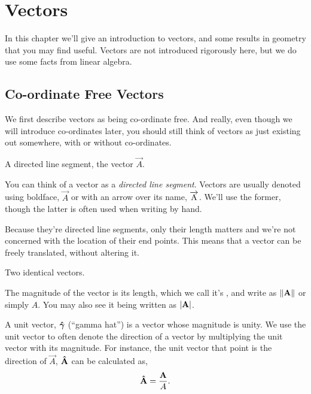 \setlength{\chnumsep}{14em}
\chapter{Vectors}

\begin{overview}
In this chapter we'll give an introduction to vectors, and some results in
geometry that you may find useful. Vectors are not introduced rigorously here,
but we do use some facts from linear algebra.
\end{overview}

\section{Co-ordinate Free Vectors}

We first describe vectors as being co-ordinate free. And really, even
though we will introduce co-ordinates later, you should still
think of vectors as just existing out somewhere, with or without
co-ordinates.

\begin{marginfigure}
\caption{A directed line segment, the vector \(\vec{A}\).}
\end{marginfigure}

You can think of a  vector as a \emph{directed line segment}.
Vectors are usually denoted using boldface, \(\vec{A}\) or with an arrow over its name,
\(\overrightarrow{\mathrm{A}}\). We'll use the former, though the latter is often used when writing by hand.


Because they're directed line segments, only their length matters and
we’re not concerned with the location of their end points. This means that a
vector can be freely translated, without altering it.

\begin{marginfigure}
\caption{Two identical vectors.}
\end{marginfigure}

The magnitude of the vector is its length, which we call it's , and write
as \(\norm{\mathbf{\boldsymbol{A}}}\) or simply \(A\). You may also see it being written as \(\abs{\mathbf{\boldsymbol{A}}}\).

A unit vector, \(\mathbf{\boldsymbol{\hat{\gamma}}}\) (“gamma hat”) is a vector whose magnitude is unity. We use the unit vector to
often denote the direction of a vector by multiplying the unit vector with its magnitude.
For instance, the unit vector that point is the direction of \(\vec{A}\), \(\mathbf{\boldsymbol{\hat{A}}}\) can be calculated as,
\[
\mathbf{\boldsymbol{\hat{A}}} = \frac{\mathbf{\boldsymbol{A}}}{A}.
\]

